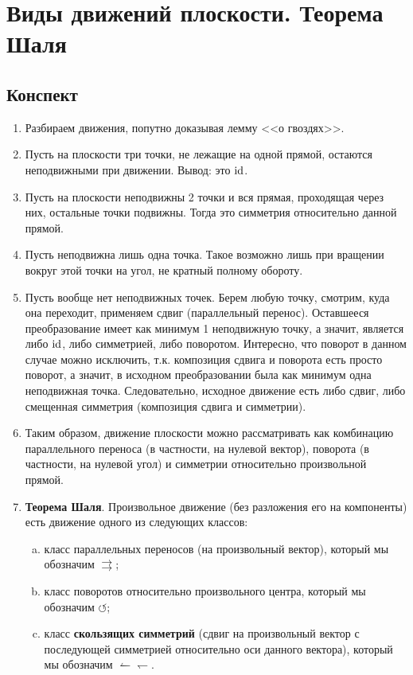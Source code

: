 
\section{Виды движений плоскости. Теорема Шаля}

\subsection{Конспект}
\begin{enumerate}\setlength{\itemsep}{1pt}
\item Разбираем движения, попутно доказывая лемму <<о гвоздях>>.
\item Пусть на плоскости три точки, не лежащие на одной прямой, остаются неподвижными при движении. Вывод: это $\mathrm{id}$.
\item Пусть на плоскости неподвижны 2 точки и вся прямая, проходящая через них, остальные точки подвижны. Тогда это симметрия относительно данной прямой.
\item Пусть неподвижна лишь одна точка. Такое возможно лишь при вращении вокруг этой точки на угол, не кратный полному обороту.
\item Пусть вообще нет неподвижных точек. Берем любую точку, смотрим, куда она переходит, применяем сдвиг (параллельный перенос). Оставшееся преобразование имеет как минимум 1 неподвижную точку, а значит, является либо $\mathrm{id}$, либо симметрией, либо поворотом. Интересно, что поворот в данном случае можно исключить, т.к. композиция сдвига и поворота есть просто поворот, а значит, в исходном преобразовании была как минимум одна неподвижная точка. Следовательно, исходное движение есть либо сдвиг, либо смещенная симметрия (композиция сдвига и симметрии).
\item Таким образом, движение плоскости можно рассматривать как комбинацию параллельного переноса (в частности, на нулевой вектор), поворота (в частности, на нулевой угол) и симметрии относительно произвольной прямой.
\item \textbf{Теорема Шаля}. Произвольное движение (без разложения его на компоненты) есть движение одного из следующих классов:
\begin{enumerate}[a)]
\item класс параллельных переносов (на произвольный вектор), который мы обозначим $\rightrightarrows$;
\item класс поворотов относительно произвольного центра, который мы обозначим $\circlearrowleft$;
\item класс \textbf{скользящих симметрий} (сдвиг на произвольный вектор с последующей симметрией относительно оси данного вектора), который мы обозначим $\leftharpoonup\leftharpoondown$.

\end{enumerate}
\end{enumerate}
